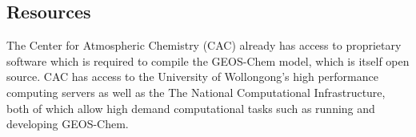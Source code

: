 \subsection{Resources}

The Center for Atmospheric Chemistry (CAC) already has access to proprietary software which is required to compile the GEOS-Chem model, which is itself open source.
CAC has access to the University of Wollongong's high performance computing servers as well as the The National Computational Infrastructure, both of which allow high demand computational tasks such as running and developing GEOS-Chem.
